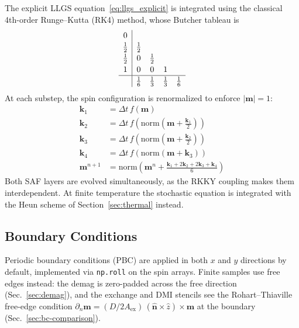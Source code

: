 \documentclass[11pt,a4paper]{article}
\newcommand{\mb}[1]{\mathbf{#1}}
\newcommand{\zhat}{\hat{z}}
\newcommand{\Aex}{A_{\text{ex}}}
\begin{document}
The explicit LLGS equation~\eqref{eq:llgs_explicit} is integrated
using the classical 4th-order Runge--Kutta (RK4) method, whose
Butcher tableau is
%
\begin{equation}
\renewcommand{\arraystretch}{1.15}
\begin{array}{c|cccc}
0           &             &             &             &   \\
\tfrac12    & \tfrac12    &             &             &   \\
\tfrac12    & 0           & \tfrac12    &             &   \\
1           & 0           & 0           & 1           &   \\
\hline
            & \tfrac16    & \tfrac13    & \tfrac13    & \tfrac16
\end{array}
\end{equation}
%
At each substep, the spin configuration is renormalized to enforce
$|\mb{m}| = 1$:
%
\begin{align}
\mb{k}_1 &= \Delta t \, f(\mb{m}) \\
\mb{k}_2 &= \Delta t \, f\!\left(
    \text{norm}\!\left(
        \mb{m} + \tfrac{\mb{k}_1}{2}
    \right)\right) \\
\mb{k}_3 &= \Delta t \, f\!\left(
    \text{norm}\!\left(
        \mb{m} + \tfrac{\mb{k}_2}{2}
    \right)\right) \\
\mb{k}_4 &= \Delta t \, f\!\left(
    \text{norm}\!\left(
        \mb{m} + \mb{k}_3
    \right)\right) \\
\mb{m}^{n+1} &= \text{norm}\!\left(
    \mb{m}^n + \frac{
        \mb{k}_1 + 2\mb{k}_2 + 2\mb{k}_3 + \mb{k}_4
    }{6}\right)
\end{align}
%
Both SAF layers are evolved simultaneously, as the RKKY coupling
makes them interdependent.  At finite temperature the stochastic
equation is integrated with the Heun scheme of
Section~\ref{sec:thermal} instead.

\subsection{Boundary Conditions}

Periodic boundary conditions (PBC) are applied in both $x$ and $y$
directions by default, implemented via \texttt{np.roll} on the spin
arrays.  Finite samples use free edges instead: the demag is
zero-padded across the free direction (Sec.~\ref{sec:demag}), and
the exchange and DMI stencils see the Rohart--Thiaville free-edge
condition
$\partial_n\mb{m} = (D/2\Aex)\,(\hat{\mb{n}}\times\zhat)\times\mb{m}$
at the boundary (Sec.~\ref{sec:bc-comparison}).
\end{document}

